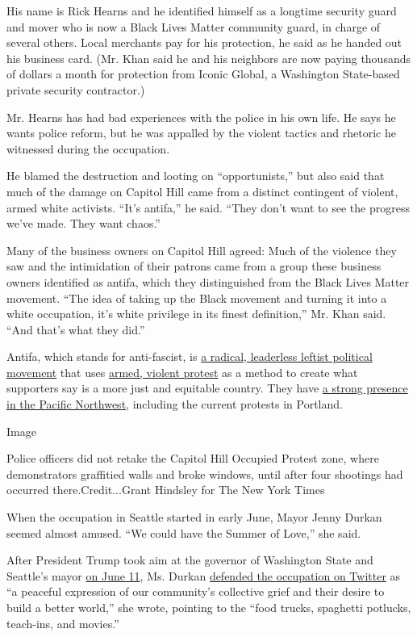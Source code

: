 His name is Rick Hearns and he identified himself as a longtime security
guard and mover who is now a Black Lives Matter community guard, in
charge of several others. Local merchants pay for his protection, he
said as he handed out his business card. (Mr. Khan said he and his
neighbors are now paying thousands of dollars a month for protection
from Iconic Global, a Washington State-based private security
contractor.)

Mr. Hearns has had bad experiences with the police in his own life. He
says he wants police reform, but he was appalled by the violent tactics
and rhetoric he witnessed during the occupation.

He blamed the destruction and looting on ``opportunists,'' but also said
that much of the damage on Capitol Hill came from a distinct contingent
of violent, armed white activists. ``It's antifa,'' he said. ``They
don't want to see the progress we've made. They want chaos.''

Many of the business owners on Capitol Hill agreed: Much of the violence
they saw and the intimidation of their patrons came from a group these
business owners identified as antifa, which they distinguished from the
Black Lives Matter movement. ``The idea of taking up the Black movement
and turning it into a white occupation, it's white privilege in its
finest definition,'' Mr. Khan said. ``And that's what they did.''

Antifa, which stands for anti-fascist, is
\href{https://www.nytimes3xbfgragh.onion/article/what-antifa-trump.html}{a
radical, leaderless leftist political movement} that uses
\href{https://newrepublic.com/article/154110/antifa-arming-trump-crackdown}{armed,
violent protest} as a method to create what supporters say is a more
just and equitable country. They have
\href{https://www.theatlantic.com/magazine/archive/2017/09/the-rise-of-the-violent-left/534192/}{a
strong presence in the Pacific Northwest}, including the current
protests in Portland.

Image

Police officers did not retake the Capitol Hill Occupied Protest zone,
where demonstrators graffitied walls and broke windows, until after four
shootings had occurred there.Credit...Grant Hindsley for The New York
Times

When the occupation in Seattle started in early June, Mayor Jenny Durkan
seemed almost amused. ``We could have the Summer of Love,'' she said.

After President Trump took aim at the governor of Washington State and
Seattle's mayor
\href{https://twitter.com/realDonaldTrump/status/1271142274416562176}{on
June 11}, Ms. Durkan
\href{https://twitter.com/MayorJenny/status/1271226494858129409}{defended
the occupation on Twitter} as ``a peaceful expression of our community's
collective grief and their desire to build a better world,'' she wrote,
pointing to the ``food trucks, spaghetti potlucks, teach-ins, and
movies.''

